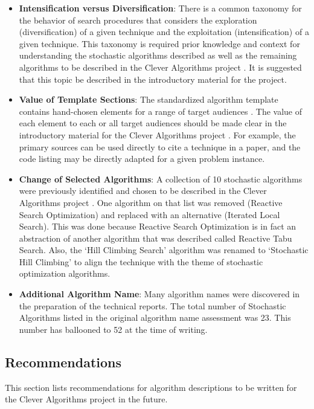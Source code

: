 \documentclass[a4paper, 11pt]{article}
\begin{document}
\begin{itemize}
	\item \textbf{Intensification versus Diversification}: There is a common taxonomy for the behavior of search procedures that considers the exploration (diversification) of a given technique and the exploitation (intensification) of a given technique. This taxonomy is required prior knowledge and context for understanding the stochastic algorithms described as well as the remaining algorithms to be described in the Clever Algorithms project \cite{Brownlee2010k}. It is suggested that this topic be described in the introductory material for the project.
	\item \textbf{Value of Template Sections}: The standardized algorithm template contains hand-chosen elements for a range of target audiences \cite{Brownlee2010a}. The value of each element to each or all target audiences should be made clear in the introductory material for the Clever Algorithms project \cite{Brownlee2010k}. For example, the primary sources can be used directly to cite a technique in a paper, and the code listing may be directly adapted for a given problem instance.
	\item \textbf{Change of Selected Algorithms}: A collection of 10 stochastic algorithms were previously identified and chosen to be described in the Clever Algorithms project \cite{Brownlee2010b}. One algorithm on that list was removed (Reactive Search Optimization) and replaced with an alternative (Iterated Local Search). This was done because Reactive Search Optimization is in fact an abstraction of another algorithm that was described called Reactive Tabu Search. Also, the `Hill Climbing Search' algorithm was renamed to `Stochastic Hill Climbing' to align the technique with the theme of stochastic optimization algorithms.
	\item \textbf{Additional Algorithm Name}: Many algorithm names were discovered in the preparation of the technical reports. The total number of Stochastic Algorithms listed in the original algorithm name assessment was 23. This number has ballooned to 52 at the time of writing.
\end{itemize}


% 
% 
\subsection{Recommendations}
This section lists recommendations for algorithm descriptions to be written for the Clever Algorithms project in the future. 
\end{document}
